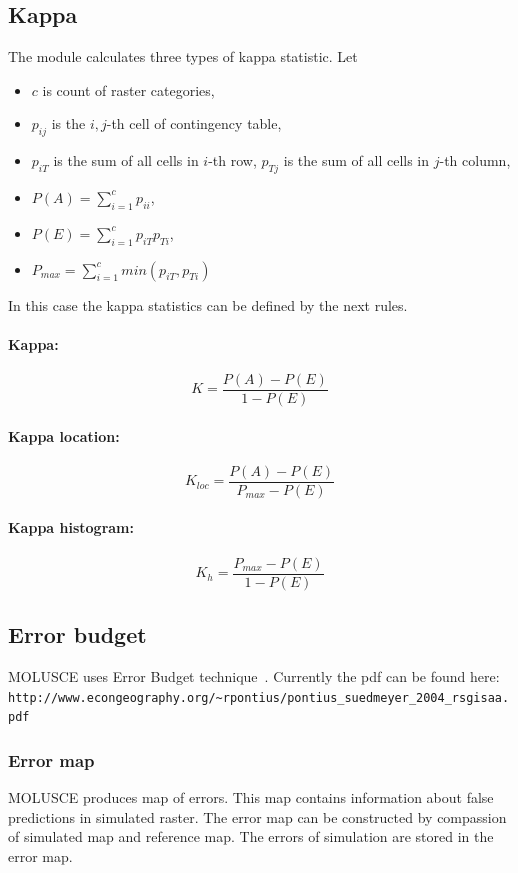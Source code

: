 \documentclass{report}
\begin{document}
\subsection{Kappa}
The module calculates three types of kappa statistic.
Let
\begin{itemize}
  \item $c$ is count of raster categories,
  \item $p_{ij}$ is the $i,j$-th cell of contingency table,
  \item $p_{iT}$ is the sum of all cells in $i$-th row, $p_{Tj}$ is the sum of all cells in $j$-th column,
  \item $P(A)=\sum _{i=1}^{c}p_{ii}$,
  \item $P(E)=\sum _{i=1}^{c}p_{iT}p_{Ti}$,
  \item $P_{max}=\sum _{i=1}^{c}min(p_{iT},p_{Ti})$ 
\end{itemize}

In this case the kappa statistics can be defined by the next rules.

\paragraph{Kappa:}
$$
K={\frac {P(A)-P(E)}{1-P(E)}}
$$

\paragraph{Kappa location:}
$$
K_{loc}={\frac {P(A)-P(E)}{P_{max}-P(E)}}
$$


\paragraph{Kappa histogram:}
$$
K_{h}={\frac {P_{max}-P(E)}{1-P(E)}}
$$

\subsection{Error budget}
MOLUSCE uses Error Budget technique~\cite[Chapter~17]{pontius2004maps_aggreament}.
Currently the pdf can be found here: \verb+http://www.econgeography.org/~rpontius/pontius_suedmeyer_2004_rsgisaa.pdf+

\subsubsection{Error map}

MOLUSCE produces map of errors. This map contains information about false predictions in simulated raster. The error map can be constructed by compassion of simulated map and reference map. The errors of simulation are stored in the error map.
\end{document}
